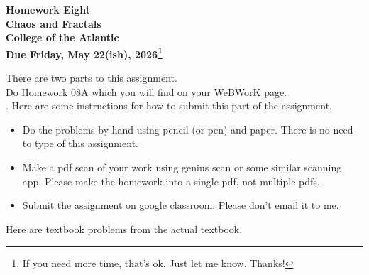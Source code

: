 \documentclass[12pt]{extarticle}
\begin{document}
\pagestyle{empty}
 
\begin{center}
  {\LARGE {\bf Homework Eight}}\\
\bigskip
{\Large {\bf Chaos and Fractals}}\\
\bigskip
{\Large {\bf College of the Atlantic}}\\
\bigskip
{ {\bf Due Friday, May 22(ish), 2026\footnote{If you need more time,
      that's ok. Just let me know. Thanks!}}}\\  
\end{center}
\medskip


\noindent There are two parts to this assignment.\\

 Do Homework 08A which you will find on your  
\href{https://webwork-hosting.runestone.academy/webwork2/coa-feldman-es1026i-spring2026}{WeBWorK 
  page}.\\ %


.  Here are some
instructions for how to submit this part of the assignment.
\begin{itemize}
\item Do the problems by hand using pencil (or pen) and paper.
  There is no need to type of this assignment.
\item Make a pdf scan of your work using genius scan or some
  similar scanning app. Please make the homework into a single
  pdf, not multiple pdfs.
\item Submit the assignment on google classroom.  Please don't
  email it to me. 
\end{itemize}

\noindent Here are textbook problems from the actual textbook.\\
\end{document}
